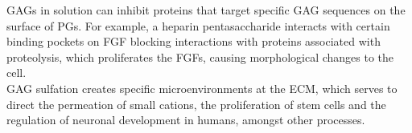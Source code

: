 \documentclass[journal=jctcce,manuscript=article]{achemso}
\begin{document}
{GAGs in solution can inhibit proteins that target specific GAG sequences on the surface of \acp{PG}. For example, a heparin pentasaccharide interacts with certain binding pockets on \ac{FGF} blocking interactions with proteins associated with proteolysis, which proliferates the \acp{FGF}, causing morphological changes to the cell\cite{SoaresdaCosta2017SulfationDisorders}. 
\\
GAG sulfation creates specific microenvironments at the \ac{ECM}, which serves to direct the permeation of small cations, the proliferation of stem cells and the regulation of neuronal development in humans, amongst other processes. 

}
\end{document}
